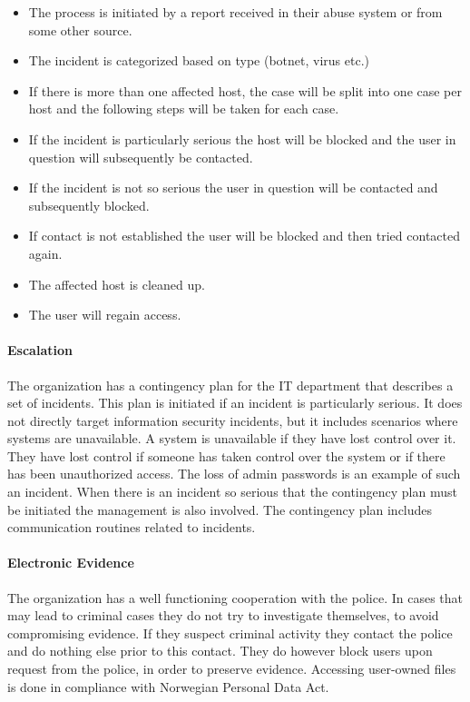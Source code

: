 \begin{itemize}\itemsep-0.2cm
\item The process is initiated by a report received in their abuse system or from some other source. 
\item The incident is categorized based on type (botnet, virus etc.)
\item If there is more than one affected host, the case will be split into one case per host and the following steps will be taken for each case.
\item If the incident is particularly serious the host will be blocked and the user in question will subsequently be contacted.
\item If the incident is not so serious the user in question will be contacted and subsequently blocked.
\item If contact is not established the user will be blocked and then tried contacted again.
\item The affected host is cleaned up.
\item The user will regain access.
\end{itemize}

\paragraph{Escalation}
The organization has a contingency plan for the IT department that describes a set of incidents. This plan is initiated if an incident is particularly serious. It does not directly target information security incidents, but it includes scenarios where systems are unavailable. A system is unavailable if they have lost control over it. They have lost control if someone has taken control over the system or if there has been unauthorized access. The loss of admin passwords is an example of such an incident. When there is an incident so serious that the contingency plan must be initiated the management is also involved. The contingency plan includes communication routines related to incidents. 

\paragraph{Electronic Evidence}
The organization has a well functioning cooperation with the police. In cases that may lead to criminal cases they do not try to investigate themselves, to avoid compromising evidence. If they suspect criminal activity they contact the police and do nothing else prior to this contact. They do however block users upon request from the police, in order to preserve evidence. Accessing user-owned files is done in compliance with Norwegian Personal Data Act.

